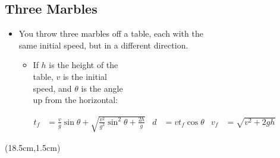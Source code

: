 \documentclass[]{article}
\begin{document}
\begin{PresentSpace}
\vspace{-10pt}
\section*{Three Marbles}
\vspace{-10pt}
\begin{itemize}
	\item You throw three marbles off a table, each with the \\
	same initial speed, but in a different direction.
	\vspace{1cm}
	\begin{itemize}
		\item If $h$ is the height of the \\
		table, $v$ is the initial \\
		speed, and $\theta$ is the angle \\
		up from the horizontal:
	\end{itemize}
\end{itemize}
\begin{align*}
	t_{f} & = \frac{v}{g}\sin\theta + \sqrt{\frac{v^{2}}{g^{2}}\sin^{2}\theta+\frac{2h}{g}} & d & = vt_{f}\cos\theta & v_{f} & = \sqrt{v^{2}+2gh}
\end{align*}
\end{PresentSpace}
\begin{textblock*}{10cm}(18.5cm,1.5cm)
	\Large
\end{textblock*}
\newpage
\end{document}
